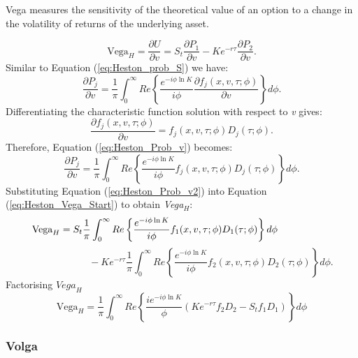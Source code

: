 \documentclass[a4paper]{article}
\begin{document}
Vega measures the sensitivity of the theoretical value of an option to a change in the volatility of returns of the underlying asset.

\begin{equation}
	\mbox{Vega}_H = \frac{\partial U}{\partial v} = S_t\frac{\partial P_1}{\partial v} - Ke^{-r\tau} \frac{\partial P_2}{\partial v}.
	\label{eq:Heston_Vega_Start}
\end{equation}
Similar to Equation (\ref{eq:Heston_prob_S}) we have:
\begin{equation}
	\frac{\partial P_j}{\partial v} = \frac{1}{\pi}\int_0^{\infty} Re \left\{ \frac{e^{-i\phi \ln K}}{i\phi} \frac{\partial f_j(x,v,\tau;\phi)}{\partial v} \right\} d\phi.
	\label{eq:Heston_Prob_v} 
\end{equation} 
Differentiating the characteristic function solution with respect to \textit{v} gives:
\begin{equation}
	\frac{\partial f_j(x,v,\tau;\phi)}{\partial v} = f_j(x,v,\tau;\phi) D_j(\tau;\phi).
	\label{eq:Heston_dfdv}
\end{equation}
Therefore, Equation (\ref{eq:Heston_Prob_v}) becomes:
\begin{equation}
	\frac{\partial P_j}{\partial v} = \frac{1}{\pi}\int_0^{\infty} Re \left\{ \frac{e^{-i\phi \ln K}}{i\phi} f_j(x,v,\tau;\phi)D_j(\tau;\phi) \right\} d\phi. 
	\label{eq:Heston_Prob_v2}
\end{equation}
Substituting Equation (\ref{eq:Heston_Prob_v2}) into Equation (\ref{eq:Heston_Vega_Start}) to obtain \textit{Vega$_H$}:
\begin{equation*}
	\hspace{-55pt} \mbox{Vega}_H =S_t\frac{1}{\pi}\int_0^{\infty} Re \left\{ \frac{e^{-i\phi \ln K}}{i\phi} f_1(x,v,\tau;\phi)D_1(\tau;\phi) \right\} d\phi
\end{equation*}
\begin{equation}
	\quad \quad \quad \quad \quad \quad - Ke^{-r\tau}\frac{1}{\pi}\int_0^{\infty} Re \left\{ \frac{e^{-i\phi \ln K}}{i\phi} f_2(x,v,\tau;\phi)D_2(\tau;\phi) \right\} d\phi.
	\label{eq:Heston_Vega}
\end{equation}
Factorising $\textit{Vega}_H$
\begin{equation}
	\mbox{Vega}_H = \frac{1}{\pi}\int_0^\infty Re \left\{ \frac{ie^{-i\phi \ln K}}{\phi} \left(   Ke^{-r\tau}f_2D_2-S_tf_1D_1 \right) \right\} d\phi
	\label{eq:Heston_Vega_Fact}
\end{equation}

\subsubsection*{Volga}
\end{document}
